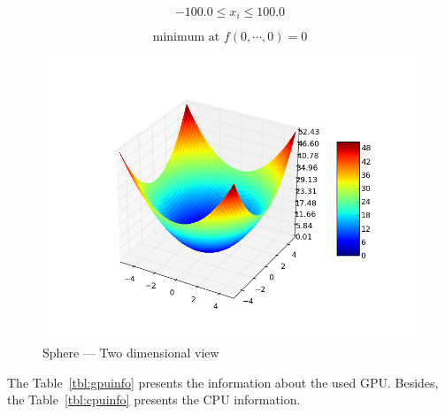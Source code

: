 \documentclass{article}
\begin{document}
    \begin{equation}
            -100.0 \leq x_i \leq 100.0
    \end{equation}

    \begin{equation}
       \text{minimum at }f(0, \cdots, 0) = 0
    \end{equation}

     \begin{figure}[!htb]
        \centering
        \includegraphics[width=.7\textwidth]{../img/sphere.png}
        \caption{Sphere --- Two dimensional view}
        \label{fig:sphere}
    \end{figure}


    The Table~\ref{tbl:gpuinfo} presents the information about the used GPU.
    Besides, the Table~\ref{tbl:cpuinfo} presents the CPU information.
\end{document}
